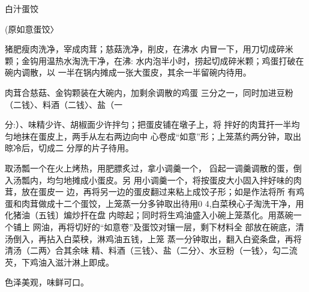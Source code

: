 \begin{recipe}{白汁蛋饺}

(原如意蛋饺〉

\ingredients



\cooking

\step 	猪肥瘦肉洗净，宰成肉茸；慈菇洗净，削皮，在沸水 内冒一下，用刀切成碎米颗；金钩用温热水淘洗干净，在沸: 水内泡半小时，捞起切成碎米颗；鸡蛋打破在碗内调散，以 一半在锅内摊成一张大蛋皮，其余一半留碗内待用。

\step 	肉茸合慈菇、金钩颗装在大碗内，加剩余调散的鸡蛋 三分之一，同时加进豆粉（二钱〉、料酒（二钱〉、盐（一

分:）、味精少许、胡椒面少许拌匀；把蛋皮铺在墩子上，将 拌好的肉茸扞一半均匀地抹在蛋皮上，两手从左右两边向中 心卷成“如意”形；上笼蒸约两分钟，取出晾冷后，切成二 分厚的片子待用。

\step 取汤瓢一个在火上烤热，用肥膘炙过，拿小调羹一个， 舀起一调羹调散的蛋，倒入汤瓢内，均匀地摊成小蛋皮。另 用小调羹一个，将按蛋皮大小固入拌好味的肉茸，放在蛋皮一 边，再将另一边的蛋皮翻过来粘上成饺子形；如是作法将所 有鸡蛋和肉茸做成十二个蛋饺，上笼蒸一分多钟取出待用0 4,白菜秧心子淘洗干净，用化猪油（五钱〕煸炒扞在盘 内晾起；同时将生鸡油盛入小碗上笼蒸化。用蒸碗一个铺上 网油，再将切好的“如意卷”及蛋饺对镶一层，剩下材料全 部放在碗底，清汤倒入，再拈入白菜秧，淋鸡油五钱，上笼 蒸一分钟取出，翻入白瓷条盘，再将清汤（二两〉合其余味 精、料酒（三钱〉、盐（二分〉、水豆粉（一钱〉，勾二流 芡，下鸡油入滋汁淋上即成。

\notes

色泽美观，味鲜可口。

\end{recipe}

